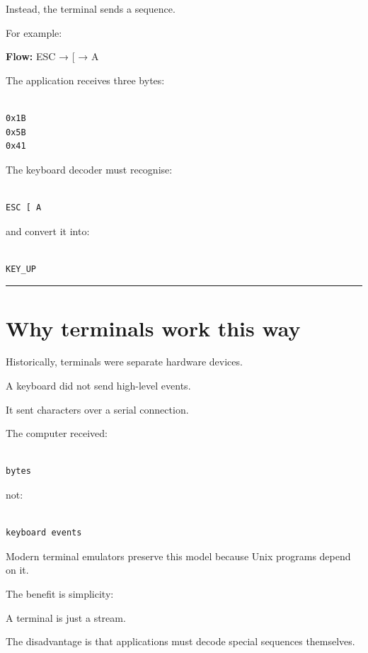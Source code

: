 \documentclass[
  oneside,
  openany]{book}
\begin{document}
Instead, the terminal sends a sequence.

For example:

\textbf{Flow:} ESC → {[} → A

The application receives three bytes:

\begin{verbatim}

0x1B
0x5B
0x41
\end{verbatim}

The keyboard decoder must recognise:

\begin{verbatim}

ESC [ A
\end{verbatim}

and convert it into:

\begin{verbatim}

KEY_UP
\end{verbatim}

\begin{center}\rule{0.5\linewidth}{0.5pt}\end{center}

\hypertarget{why-terminals-work-this-way}{%
\section{Why terminals work this
way}\label{why-terminals-work-this-way}}

Historically, terminals were separate hardware devices.

A keyboard did not send high-level events.

It sent characters over a serial connection.

The computer received:

\begin{verbatim}

bytes
\end{verbatim}

not:

\begin{verbatim}

keyboard events
\end{verbatim}

Modern terminal emulators preserve this model because Unix programs
depend on it.

The benefit is simplicity:

A terminal is just a stream.

The disadvantage is that applications must decode special sequences
themselves.
\end{document}
